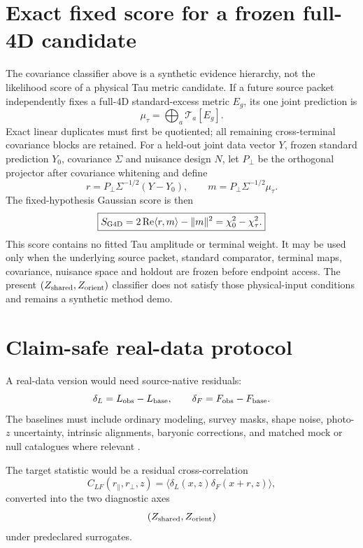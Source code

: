 \documentclass[12pt]{article}
\begin{document}
\section{Exact fixed score for a frozen full-4D candidate}

The covariance classifier above is a synthetic evidence hierarchy, not the
likelihood score of a physical Tau metric candidate.  If a future source
packet independently fixes a full-4D standard-excess metric \(E_g\), its one
joint prediction is
\[
 \mu_\tau=\bigoplus_a\mathcal T_a[E_g].
\]
Exact linear duplicates must first be quotiented; all remaining
cross-terminal covariance blocks are retained.  For a held-out joint data
vector \(Y\), frozen standard prediction \(Y_0\), covariance \(\Sigma\) and
nuisance design \(N\), let \(P_\perp\) be the orthogonal projector after
covariance whitening and define
\[
 r=P_\perp\Sigma^{-1/2}(Y-Y_0),\qquad
 m=P_\perp\Sigma^{-1/2}\mu_\tau.
\]
The fixed-hypothesis Gaussian score is then
\begin{equation}
 \boxed{S_{\rm G4D}=2\operatorname{Re}\langle r,m\rangle-\|m\|^2
 =\chi_0^2-\chi_\tau^2.}
 \label{eq:paper17-g4d-fixed-score}
\end{equation}
This score contains no fitted Tau amplitude or terminal weight.  It may be
used only when the underlying source packet, standard comparator, terminal
maps, covariance, nuisance space and holdout are frozen before endpoint
access.  The present \((Z_{\rm shared},Z_{\rm orient})\) classifier does not
satisfy those physical-input conditions and remains a synthetic method demo.

\section{Claim-safe real-data protocol}

A real-data version would need source-native residuals:
\[
  \delta_L=L_{\rm obs}-L_{\rm base},
  \qquad
  \delta_F=F_{\rm obs}-F_{\rm base}.
\]
The baselines must include ordinary modeling, survey masks, shape noise,
photo-\(z\) uncertainty, intrinsic alignments, baryonic corrections, and matched
mock or null catalogues where relevant \cite{KiDS1000,ACTDR6Lensing,DESI2016}.

The target statistic would be a residual cross-correlation
\[
  C_{LF}(r_{\parallel},r_{\perp},z)
  =
  \langle
  \delta_L(x,z)\delta_F(x+r,z)
  \rangle,
\]
converted into the two diagnostic axes
\[
  (Z_{\rm shared},Z_{\rm orient})
\]
under predeclared surrogates.
\end{document}
